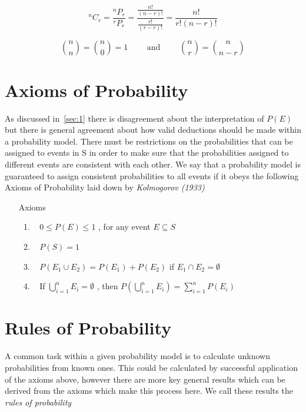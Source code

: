 \documentclass[english,course]{Notes}
\newcommand{\ita}[1]{\textit{#1}}
\newcommand\comb[2]{^{#1}C_{#2}}
\newcommand\perm[2]{^{#1}P_{#2}}
\begin{document}
$$\comb{n}{r} = \frac{\perm{n}{r}}{\perm{r}{r}} = \frac{\frac{n!}{(n-r)!}}{\frac{r!}{(r-r)!}} = \frac{n!}{r!(n-r)!}$$

 $${ n \choose n} = {n \choose 0 } = 1 \qquad \text{ and } \qquad  {n \choose r }= {n \choose {n-r}}$$
 
 \section{Axioms of Probability}
 
 \par{As discussed in~\ref{sec:1} there is disagreement about the interpretation of $P(E)$ but there is general agreement about how valid deductions should be made within a probability model. There must be restrictions on the probabilities that can be assigned to events in S in order to make sure that the probabilities assigned to different events are consistent with each other. We say that a probability model is guaranteed to assign consistent probabilities to all events if it obeys the
following Axioms of Probability laid down by \ita{Kolmogorov (1933)}}
 
 \begin{itemize}
 \item[Axioms]
 \begin{enumerate}
 \item~\label{itm:ax1} $0 \leq P(E) \leq 1$ , for any event $E \subseteq S$ 
 \item~\label{itm:ax2} $P(S) = 1$ 
 \item~\label{itm:ax3}  $P(E_{1} \cup E_{2}) = P(E_{1}) + P(E_{2})$ if $E_{1} \cap E_{2} = \emptyset$ 
 \item~\label{itm:ax4} If $\bigcup_{i=1}^{n}E_{i} = \emptyset$ , then $P(\bigcup_{i=1}^{n}E_{i}) = \sum_{i=1}^{n} P(E_{i})$ 
 \end{enumerate}
 \end{itemize}
 
\section{Rules of Probability}

\par{A common task within a given probability model is to calculate unknown probabilities from known ones. This could be calculated by successful application of the axioms above, however there are more key general results which can be derived from the axioms which make this process here. We call these results the \ita{rules of probability}}
\end{document}
